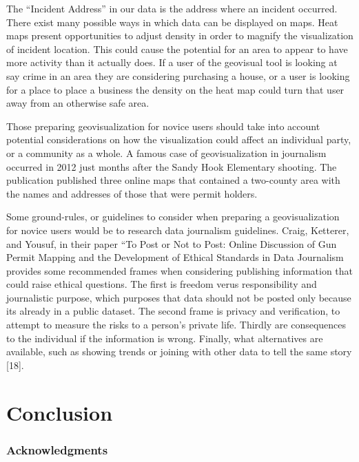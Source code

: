 \documentclass[runningheads]{llncs}
\begin{document}
The “Incident Address” in our data is the address where an incident occurred. There exist many possible ways in which data can be displayed on maps. Heat maps present opportunities to adjust density in order to magnify the visualization of incident location. This could cause the potential for an area to appear to have more activity than it actually does. If a user of the geovisual tool is looking at say crime in an area they are considering purchasing a house, or a user is looking for a place to place a business the density on the heat map could turn that user away from an otherwise safe area.

Those preparing geovisualization for novice users should take into account potential considerations on how the visualization could affect an individual party, or a community as a whole. A famous case of geovisualization in journalism occurred in 2012 just months after the Sandy Hook Elementary shooting. The publication published three online maps that contained a two-county area with the names and addresses of those that were permit holders. 

Some ground-rules, or guidelines to consider when preparing a geovisualization for novice users would be to research data journalism guidelines. Craig, Ketterer, and Yousuf, in their paper “To Post or Not to Post: Online Discussion of Gun Permit Mapping and the Development of Ethical Standards in Data Journalism provides some recommended frames when considering publishing information that could raise ethical questions. The first is freedom verus responsibility and journalistic purpose, which purposes that data should not be posted only because its already in a public dataset. The second frame is privacy and verification, to attempt to measure the risks to a person’s private life. Thirdly are consequences to the individual if the information is wrong. Finally, what alternatives are available, such as showing trends or joining with other data to tell the same story [18].


\section{Conclusion}

\subsubsection{Acknowledgments}
\end{document}
